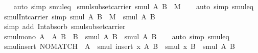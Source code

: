 \begin{isabellebody}
%
\isadelimproof
\ \ %
\endisadelimproof
%
\isatagproof
{}\isamarkupfalse%
\ {\isacharparenleft}{\kern0pt}auto\ simp{\isacharcolon}{\kern0pt}\ smul{\isacharunderscore}{\kern0pt}eq{\isacharparenright}{\kern0pt}%
\endisatagproof
{\isafoldproof}%
%
\isadelimproof
\isanewline
%
\endisadelimproof
\isanewline
{}\isamarkupfalse%
\ smul{\isacharunderscore}{\kern0pt}subset{\isacharunderscore}{\kern0pt}carrier{\isacharcolon}{\kern0pt}\ {\isachardoublequoteopen}smul\ A\ B\ {\isasymsubseteq}\ M{\isachardoublequoteclose}\isanewline
%
\isadelimproof
\ \ %
\endisadelimproof
%
\isatagproof
{}\isamarkupfalse%
\ {\isacharparenleft}{\kern0pt}auto\ simp{\isacharcolon}{\kern0pt}\ smul{\isacharunderscore}{\kern0pt}eq{\isacharparenright}{\kern0pt}%
\endisatagproof
{\isafoldproof}%
%
\isadelimproof
\isanewline
%
\endisadelimproof
\isanewline
{}\isamarkupfalse%
\ smul{\isacharunderscore}{\kern0pt}Int{\isacharunderscore}{\kern0pt}carrier\ {\isacharbrackleft}{\kern0pt}simp{\isacharbrackright}{\kern0pt}{\isacharcolon}{\kern0pt}\ {\isachardoublequoteopen}smul\ A\ B\ {\isasyminter}\ M\ {\isacharequal}{\kern0pt}\ smul\ A\ B{\isachardoublequoteclose}\isanewline
%
\isadelimproof
\ \ %
\endisadelimproof
%
\isatagproof
{}\isamarkupfalse%
\ {\isacharparenleft}{\kern0pt}simp\ add{\isacharcolon}{\kern0pt}\ Int{\isacharunderscore}{\kern0pt}absorb{}\ smul{\isacharunderscore}{\kern0pt}subset{\isacharunderscore}{\kern0pt}carrier{\isacharparenright}{\kern0pt}%
\endisatagproof
{\isafoldproof}%
%
\isadelimproof
\isanewline
%
\endisadelimproof
\isanewline
{}\isamarkupfalse%
\ smul{\isacharunderscore}{\kern0pt}mono{\isacharcolon}{\kern0pt}\ {\isachardoublequoteopen}{\isasymlbrakk}A{\isacharprime}{\kern0pt}\ {\isasymsubseteq}\ A{\isacharsemicolon}{\kern0pt}\ B{\isacharprime}{\kern0pt}\ {\isasymsubseteq}\ B{\isasymrbrakk}\ {\isasymLongrightarrow}\ smul\ A{\isacharprime}{\kern0pt}\ B{\isacharprime}{\kern0pt}\ {\isasymsubseteq}\ smul\ A\ B{\isachardoublequoteclose}\isanewline
%
\isadelimproof
\ \ %
\endisadelimproof
%
\isatagproof
{}\isamarkupfalse%
\ {\isacharparenleft}{\kern0pt}auto\ simp{\isacharcolon}{\kern0pt}\ smul{\isacharunderscore}{\kern0pt}eq{\isacharparenright}{\kern0pt}%
\endisatagproof
{\isafoldproof}%
%
\isadelimproof
\isanewline
%
\endisadelimproof
\isanewline
{}\isamarkupfalse%
\ smul{\isacharunderscore}{\kern0pt}insert{}{\isacharcolon}{\kern0pt}\ {\isachardoublequoteopen}NO{\isacharunderscore}{\kern0pt}MATCH\ {\isacharbraceleft}{\kern0pt}{\isacharbraceright}{\kern0pt}\ A\ {\isasymLongrightarrow}\ smul\ {\isacharparenleft}{\kern0pt}insert\ x\ A{\isacharparenright}{\kern0pt}\ B\ {\isacharequal}{\kern0pt}\ smul\ {\isacharbraceleft}{\kern0pt}x{\isacharbraceright}{\kern0pt}\ B\ {\isasymunion}\ smul\ A\ B{\isachardoublequoteclose}\isanewline

\end{isabellebody}
